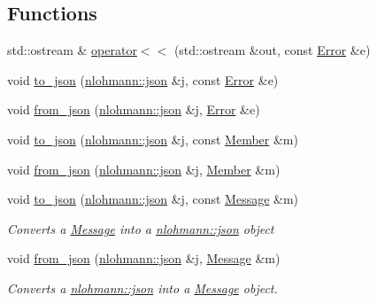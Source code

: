 \subsection*{Functions}
\begin{DoxyCompactItemize}
\item 
std\+::ostream \& \hyperlink{namespaceshaan97_1_1sync_a734625a59747d9c85857e245a8975bb9}{operator$<$$<$} (std\+::ostream \&out, const \hyperlink{classshaan97_1_1sync_1_1_error}{Error} \&e)
\item 
void \hyperlink{namespaceshaan97_1_1sync_a6ccb9e98c182a3bac3ee37ad64f76bbc}{to\+\_\+json} (\hyperlink{namespacenlohmann_a2bfd99e845a2e5cd90aeaf1b1431f474}{nlohmann\+::json} \&j, const \hyperlink{classshaan97_1_1sync_1_1_error}{Error} \&e)
\item 
void \hyperlink{namespaceshaan97_1_1sync_a9e374973ba3aed17d32efd550318c94c}{from\+\_\+json} (\hyperlink{namespacenlohmann_a2bfd99e845a2e5cd90aeaf1b1431f474}{nlohmann\+::json} \&j, \hyperlink{classshaan97_1_1sync_1_1_error}{Error} \&e)
\item 
void \hyperlink{group___serialization_gaad90c8bd50725f5382dc2207225f52ee}{to\+\_\+json} (\hyperlink{namespacenlohmann_a2bfd99e845a2e5cd90aeaf1b1431f474}{nlohmann\+::json} \&j, const \hyperlink{classshaan97_1_1sync_1_1_member}{Member} \&m)
\item 
void \hyperlink{group___serialization_ga35dd3deb42a1ec52e00a2980b5c7c842}{from\+\_\+json} (\hyperlink{namespacenlohmann_a2bfd99e845a2e5cd90aeaf1b1431f474}{nlohmann\+::json} \&j, \hyperlink{classshaan97_1_1sync_1_1_member}{Member} \&m)
\item 
void \hyperlink{group___serialization_ga213581ca789d5151c699fb4cb30db916}{to\+\_\+json} (\hyperlink{namespacenlohmann_a2bfd99e845a2e5cd90aeaf1b1431f474}{nlohmann\+::json} \&j, const \hyperlink{structshaan97_1_1sync_1_1_message}{Message} \&m)
\begin{DoxyCompactList}\small\item\em Converts a {\ttfamily \hyperlink{structshaan97_1_1sync_1_1_message}{Message}} into a {\ttfamily \hyperlink{namespacenlohmann_a2bfd99e845a2e5cd90aeaf1b1431f474}{nlohmann\+::json} object} \end{DoxyCompactList}\item 
void \hyperlink{group___serialization_gaba06015bb8b13049b093f0bde8e89377}{from\+\_\+json} (\hyperlink{namespacenlohmann_a2bfd99e845a2e5cd90aeaf1b1431f474}{nlohmann\+::json} \&j, \hyperlink{structshaan97_1_1sync_1_1_message}{Message} \&m)
\begin{DoxyCompactList}\small\item\em Converts a {\ttfamily \hyperlink{namespacenlohmann_a2bfd99e845a2e5cd90aeaf1b1431f474}{nlohmann\+::json}} into a {\ttfamily \hyperlink{structshaan97_1_1sync_1_1_message}{Message}} object. \end{DoxyCompactList}\end{DoxyCompactItemize}


